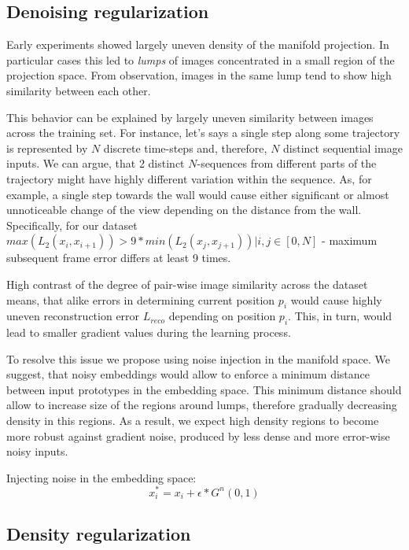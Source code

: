 \subsection{Denoising regularization}

Early experiments showed largely uneven density of the manifold projection.
In particular cases this led to \textit{lumps} of images concentrated in a small region of the projection space.
From observation, images in the same lump tend to show high similarity between each other.

This behavior can be explained by largely uneven similarity between images across the training set.
For instance, let's says a single step along some trajectory is represented by $N$ discrete time-steps and, therefore, $N$ distinct sequential image inputs.
We can argue, that 2 distinct $N$-sequences from different parts of the trajectory might have highly different variation within the sequence.
As, for example, a single step towards the wall would cause either significant or almost unnoticeable change of the view depending on the distance from the wall. Specifically, for our dataset $max(L_2(x_i, x_{i+1})) > 9 * min(L_2(x_j, x_{j+1})) | i,j \in [0, N]$ - maximum subsequent frame error differs at least 9 times.

High contrast of the degree of pair-wise image similarity across the dataset means, that alike errors in determining current position $p_i$ would cause highly uneven reconstruction error $L_{reco}$ depending on position $p_i$.
This, in turn, would lead to smaller gradient values during the learning process.

To resolve this issue we propose using noise injection in the manifold space.
We suggest, that noisy embeddings would allow to enforce a minimum distance between input prototypes in the embedding space.
This minimum distance should allow to increase size of the regions around lumps, therefore gradually decreasing density in this regions.
As a result, we expect high density regions to become more robust against gradient noise, produced by less dense and more error-wise noisy inputs.

Injecting noise in the embedding space:
\begin{equation}
  x_i^* = x_i + \epsilon*G^n(0, 1)
\end{equation}

\subsection{Density regularization}

